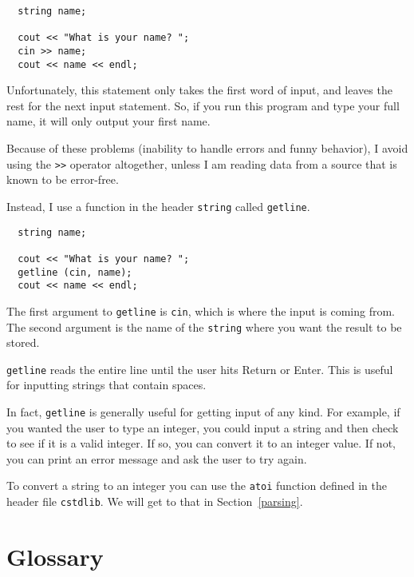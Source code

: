 \begin{verbatim}
  string name;

  cout << "What is your name? ";
  cin >> name;
  cout << name << endl;
\end{verbatim}
%
Unfortunately, this statement only takes the first word of
input, and leaves the rest for the next input statement.
So, if you run this program and type your full name, it
will only output your first name.

Because of these problems (inability to handle errors and
funny behavior), I avoid using the {\tt >>} operator altogether,
unless I am reading data from a source that is known to be
error-free.

Instead, I use a function in the header {\tt string} called {\tt getline}.

\begin{verbatim}
  string name;

  cout << "What is your name? ";
  getline (cin, name);
  cout << name << endl;
\end{verbatim}
%
The first argument to {\tt getline} is {\tt cin}, which is
where the input is coming from.  The second argument is the
name of the {\tt string} where you want the result to be
stored.

{\tt getline} reads the entire line until the user hits
Return or Enter.  This is useful for inputting strings that
contain spaces.

In fact, {\tt getline} is generally useful for getting input
of any kind.  For example, if you wanted the user to type an
integer, you could input a string and then check to see if
it is a valid integer.  If so, you can convert it to an integer
value.  If not, you can print an error message and ask the user
to try again.

To convert a string to an integer you can use the {\tt atoi}
function defined in the header file {\tt cstdlib}.  We will
get to that in Section~\ref{parsing}.

\section{Glossary}

